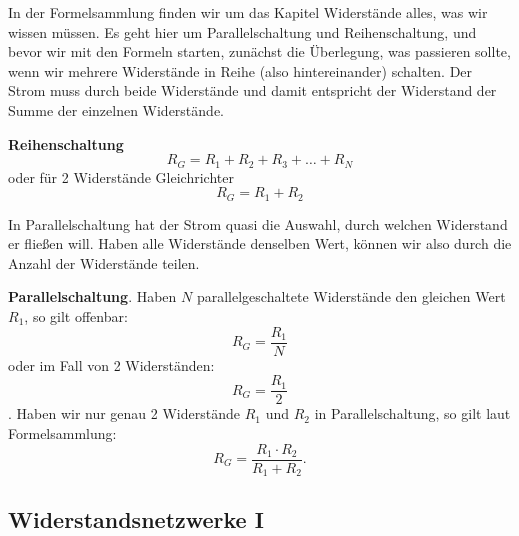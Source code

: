 \begin{ohmchapter}

    In der Formelsammlung finden wir um das Kapitel Widerstände alles, was wir wissen müssen.
    Es geht hier um Parallelschaltung und Reihenschaltung, und bevor wir mit den Formeln starten, zunächst die Überlegung, was passieren sollte, wenn wir mehrere Widerstände in Reihe (also hintereinander) schalten. Der Strom muss durch beide Widerstände und damit entspricht der Widerstand der Summe der einzelnen Widerstände.

    \textbf{Reihenschaltung}
    $$ R_G = R_1+ R_2 + R_3 + \ldots + R_N$$
    oder für 2 Widerstände Gleichrichter
    $$ R_G = R_1+ R_2 $$

   In Parallelschaltung hat der Strom quasi die Auswahl, durch welchen Widerstand er fließen will. Haben alle Widerstände denselben Wert, können wir also durch die Anzahl der Widerstände teilen. 

     \textbf{Parallelschaltung}. 
     Haben $N$ parallelgeschaltete Widerstände den gleichen Wert $R_1$, so gilt offenbar:
   $$ R_G = \frac{R_1}{N} $$ oder im Fall von 2 Widerständen:
  $$ R_G = \frac{R_1}{2} $$.
   Haben wir nur genau 2 Widerstände $R_1$ und $R_2$ in Parallelschaltung, so gilt laut Formelsammlung:
   $$ R_G = \frac{R_1\cdot R_2}{R_1 + R_2}. $$

  
  
\end{ohmchapter}


\subsection{Widerstandsnetzwerke I}

